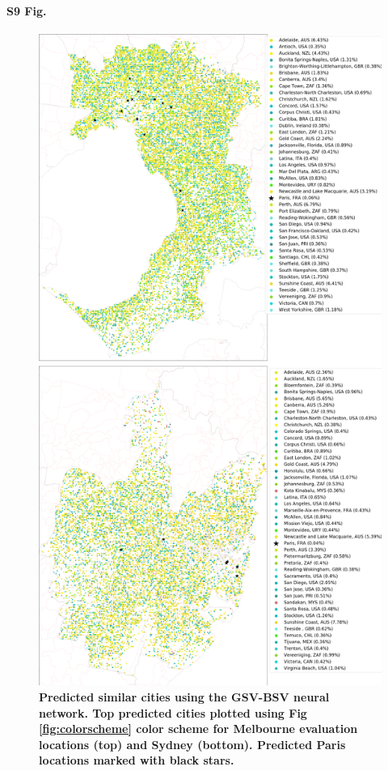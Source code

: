\documentclass[10pt,letterpaper,hidelinks]{article}
\begin{document}
\paragraph*{S9 Fig.}
\begin{figure}[!htbp]
\centering    
\includegraphics[scale=0.16]{Images/PlosOne/Fig9.png} 
\caption{\bf Predicted similar cities using the GSV-BSV neural network. Top predicted cities plotted using Fig \ref{fig:colorscheme} color scheme for Melbourne evaluation locations (top) and Sydney (bottom). Predicted Paris locations marked with black stars.}   
 \label{fig:melstreet}  
\end{figure}
\end{document}
